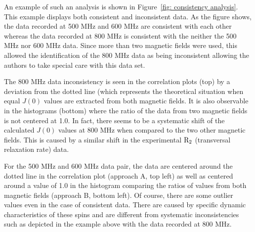 An example of such an analysis is shown in Figure~\ref{fig: consistency analysis}.  This example displays both consistent and inconsistent data.  As the figure shows, the data recorded at 500 MHz and 600 MHz are consistent with each other whereas the data recorded at 800 MHz is consistent with the neither the 500 MHz nor 600 MHz data.  Since more than two magnetic fields were used, this allowed the identification of the 800 MHz data as being inconsistent allowing the authors to take special care with this data set.

The 800 MHz data inconsistency is seen in the correlation plots (top) by a deviation from the dotted line (which represents the theoretical situation when equal $J(0)$ values are extracted from both magnetic fields.  It is also observable in the histograms (bottom) where the ratio of the data from two magnetic fields is not centered at 1.0.  In fact, there seems to be a systematic shift of the calculated $J(0)$ values at 800 MHz when compared to the two other magnetic fields.  This is caused by a similar shift in the experimental $\mathrm{R}_2$ (transversal relaxation rate) data.

For the 500 MHz and 600 MHz data pair, the data are centered around the dotted line in the correlation plot (approach A, top left) as well as centered around a value of 1.0 in the histogram comparing the ratios of values from both magnetic fields (approach B, bottom left).  Of course, there are some outlier values even in the case of consistent data.  There are caused by specific dynamic characteristics of these spins and are different from systematic inconsistencies such as depicted in the example above with the data recorded at 800 MHz.
